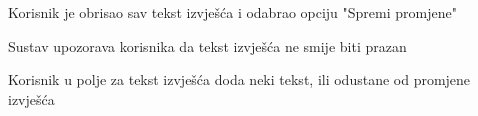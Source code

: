 \begin{packed_item}
\begin{packed_item}
\begin{packed_enum}
							\end{packed_enum}
							
						\item[4.b] Korisnik je obrisao sav tekst izvješća i odabrao opciju "Spremi promjene"
							\item[] \begin{packed_enum}
								
								\item Sustav upozorava korisnika da tekst izvješća ne smije biti prazan
								\item Korisnik u polje za tekst izvješća doda neki tekst, ili odustane od promjene izvješća
								
							\end{packed_enum}
						\end{packed_item}
						
						
						
					\end{packed_item}					
					

